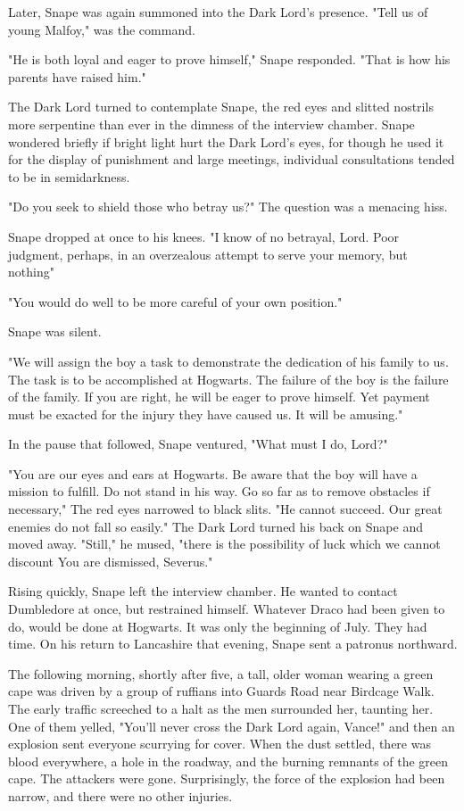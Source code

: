 Later, Snape was again summoned into the Dark Lord's presence. "Tell us of young Malfoy," was the command.

"He is both loyal and eager to prove himself," Snape responded. "That is how his parents have raised him."

The Dark Lord turned to contemplate Snape, the red eyes and slitted nostrils more serpentine than ever in the dimness of the interview chamber. Snape wondered briefly if bright light hurt the Dark Lord's eyes, for though he used it for the display of punishment and large meetings, individual consultations tended to be in semidarkness.

"Do you seek to shield those who betray us?" The question was a menacing hiss.

Snape dropped at once to his knees. "I know of no betrayal, Lord. Poor judgment, perhaps, in an overzealous attempt to serve your memory, but nothing{\el}"

"You would do well to be more careful of your own position."

Snape was silent.

"We will assign the boy a task to demonstrate the dedication of his family to us. The task is to be accomplished at Hogwarts. The failure of the boy is the failure of the family. If you are right, he will be eager to prove himself. Yet payment must be exacted for the injury they have caused us. It will be amusing."

In the pause that followed, Snape ventured, "What must I do, Lord?"

"You are our eyes and ears at Hogwarts. Be aware that the boy will have a mission to fulfill. Do not stand in his way. Go so far as to remove obstacles if necessary," The red eyes narrowed to black slits. "He cannot succeed. Our great enemies do not fall so easily." The Dark Lord turned his back on Snape and moved away. "Still," he mused, "there is the possibility of luck which we cannot discount{\el} You are dismissed, Severus."

Rising quickly, Snape left the interview chamber. He wanted to contact Dumbledore at once, but restrained himself. Whatever Draco had been given to do, would be done at Hogwarts. It was only the beginning of July. They had time. On his return to Lancashire that evening, Snape sent a patronus northward.

The following morning, shortly after five, a tall, older woman wearing a green cape was driven by a group of ruffians into Guards Road near Birdcage Walk. The early traffic screeched to a halt as the men surrounded her, taunting her. One of them yelled, "You'll never cross the Dark Lord again, Vance!" and then an explosion sent everyone scurrying for cover. When the dust settled, there was blood everywhere, a hole in the roadway, and the burning remnants of the green cape. The attackers were gone. Surprisingly, the force of the explosion had been narrow, and there were no other injuries.

